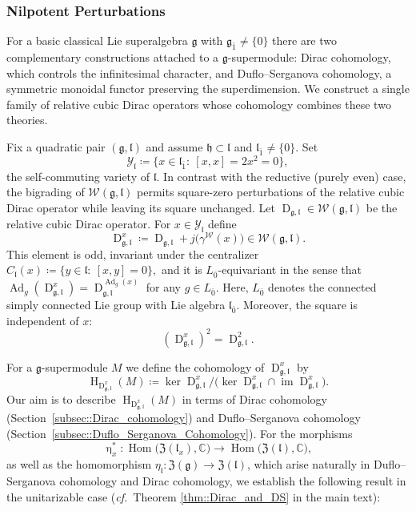 \documentclass[11pt]{amsart}
\newcommand{\Hom}{\operatorname{Hom}}
\renewcommand{\Im}{\operatorname{im}}
\newcommand{\Dirac}{\operatorname{D}}
\def\WW{{\mathcal{W}}}
\def\CC{{\mathbb C}}
\def\hh{{\mathfrak h}}
\def\ZG{{\mathfrak{Z}(\gg)}}
\def\H{{\operatorname{H}}}
\def\ll{{\mathfrak l}}
\def\YY{{\mathcal Y}}
\def\odd{{\mathfrak{g}_{\bar{1}}}}
\def\gg{{\mathfrak{g}}}
\newcommand{\Ad}{\operatorname{Ad}}
\theoremstyle{plain}
\theoremstyle{remark}
\theoremstyle{definition}
\numberwithin{equation}{section}
\theoremstyle{remark}
\begin{document}
\subsubsection{Nilpotent Perturbations} 

For a basic classical Lie superalgebra $\gg$ with $\odd\neq\{0\}$ there are two complementary constructions attached to a $\gg$-supermodule: Dirac cohomology, which controls the infinitesimal character, and Duflo--Serganova cohomology, a symmetric monoidal functor preserving the superdimension. We construct a single family of relative cubic Dirac operators whose cohomology combines these two theories.

Fix a quadratic pair $(\gg,\ll)$ and assume $\hh\subset\ll$ and $\ll_{\bar 1}\neq\{0\}$. Set
\begin{equation}\label{eq:self-commuting-variety}
 \YY_{\ll}\coloneqq \{x\in\ll_{\bar 1}:\ [x,x]=2x^{2}=0\},
\end{equation}
the self-commuting variety of $\ll$. In contrast with the reductive (purely even) case, the bigrading of $\WW(\gg,\ll)$ permits square-zero perturbations of the relative cubic Dirac operator while leaving its square unchanged. Let $\Dirac_{\gg,\ll}\in \WW(\gg,\ll)$ be the relative cubic Dirac operator. For $x\in\YY_{\ll}$ define
\begin{equation}\label{eq:Dirac-x-def}
\Dirac^{x}_{\gg,\ll}\coloneqq \Dirac_{\gg,\ll}+j\bigl(\gamma^{\WW}(x)\bigr)\in \WW(\gg,\ll).
\end{equation}
This element is odd, invariant under the centralizer
$
 C_{\ll}(x)\coloneqq \{y\in\ll:\ [x,y]=0\},
$
and it is $L_{\bar 0}$-equivariant in the sense that
$
 \Ad_{g}(\Dirac^{x}_{\gg,\ll})=\Dirac^{\Ad_{g}(x)}_{\gg,\ll}
$
for any $g \in L_{\bar{0}}$.
Here, $L_{\bar{0}}$ denotes the connected simply connected Lie group with Lie algebra $\ll_{\bar{0}}$. Moreover, the square is independent of $x$:
\begin{equation}\label{eq:square-Dirac-x}
 (\Dirac^{x}_{\gg,\ll})^{2}=\Dirac_{\gg,\ll}^{2}.
\end{equation}

For a $\gg$-supermodule $M$ we define the cohomology of $\Dirac^{x}_{\gg,\ll}$ by
\begin{equation}\label{eq:H-Dirac-x}
 \H_{\Dirac^{x}_{\gg,\ll}}(M)\coloneqq \ker \Dirac^{x}_{\gg,\ll}\big/\bigl(\ker \Dirac^{x}_{\gg,\ll}\cap \Im \Dirac^{x}_{\gg,\ll}\bigr).
\end{equation}
Our aim is to describe $\H_{\Dirac^{x}_{\gg,\ll}}(M)$ in terms of Dirac cohomology (Section~\ref{subsec::Dirac_cohomology}) and Duflo--Serganova cohomology (Section~\ref{subsec::Duflo_Serganova_Cohomology}). For the morphisms
\begin{equation}\label{eq:upeta-dual}
 \upeta_{x}^{\ast}:\Hom\bigl(\mathfrak Z(\ll_{x}),\CC\bigr)\longrightarrow \Hom\bigl(\mathfrak Z(\ll),\CC\bigr),
\end{equation}
as well as the homomorphism $\eta_{\ll}:\ZG\to\mathfrak Z(\ll)$, which arise naturally in Duflo--Serganova cohomology and Dirac cohomology, we establish the following result in the unitarizable case (\emph{cf.}~Theorem \ref{thm::Dirac_and_DS} in the main text): 
\end{document}
